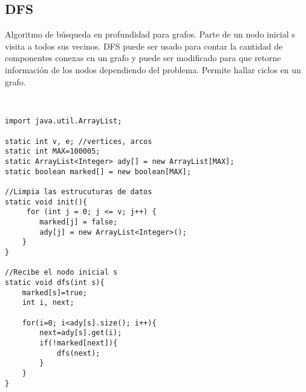 \documentclass[11pt,letterpaper,twocolumn,twosided]{article}
\begin{document}
\subsection{DFS}
Algoritmo de b\'usqueda en profundidad para grafos. Parte de un nodo inicial s visita a todos sus vecinos. DFS puede ser usado para contar la cantidad de componentes conexas en un grafo y puede ser modificado para que retorne informaci\'on de los nodos dependiendo del problema. Permite hallar ciclos en un grafo.
\begin{lstlisting}


import java.util.ArrayList;

static int v, e; //vertices, arcos
static int MAX=100005; 
static ArrayList<Integer> ady[] = new ArrayList[MAX];
static boolean marked[] = new boolean[MAX];

//Limpia las estrucuturas de datos
static void init(){
	 for (int j = 0; j <= v; j++) {
        marked[j] = false;
        ady[j] = new ArrayList<Integer>();
    }
}

//Recibe el nodo inicial s
static void dfs(int s){
	marked[s]=true;
	int i, next;

	for(i=0; i<ady[s].size(); i++){
		next=ady[s].get(i);
		if(!marked[next]){
			dfs(next);
		}
	}
}
\end{lstlisting}
\end{document}
